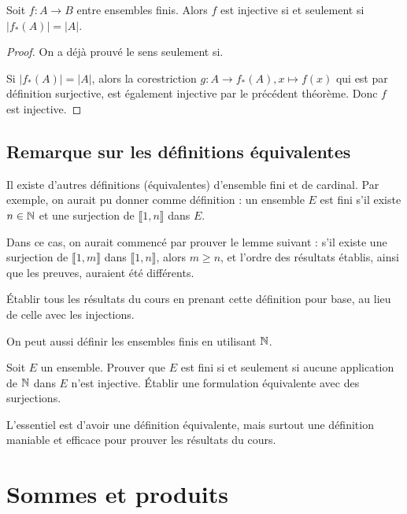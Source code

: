 \begin{corollaire}
Soit $f : A\to B$ entre ensembles finis. Alors $f$ est injective si et seulement si $|f_*(A)|=|A|$.
\end{corollaire}
\begin{proof}On a déjà prouvé le sens \og seulement si\fg.

Si $|f_*(A)|=|A|$, alors la corestriction $g : A\to f_*(A), x\mapsto f(x)$ qui est par définition surjective, est également injective par le précédent théorème. Donc $f$ est injective.
\end{proof}



\subsection{Remarque sur les définitions équivalentes}

Il existe d'autres définitions (équivalentes) d'ensemble fini et de cardinal.
Par exemple, on aurait pu donner comme définition  : un ensemble $E$ est fini s'il existe $n\in \mathbb{N}$ et une surjection de $\llbracket 1,n\rrbracket$ dans $E$.

Dans ce cas, on aurait commencé par prouver le lemme suivant : \og s'il existe une surjection de $\llbracket 1,m\rrbracket$ dans $\llbracket 1,n\rrbracket$, alors $m\geq n$\fg, et l'ordre des résultats établis, ainsi que les preuves, auraient été différents.

\begin{exercice} \'Etablir tous les résultats du cours en prenant  cette définition pour base, au lieu de celle avec les injections.
\end{exercice}

On peut aussi définir les ensembles finis en utilisant $\mathbb{N}$.

\begin{exercice}
Soit $E$ un ensemble.
Prouver que $E$ est fini si et seulement si aucune application de $\mathbb{N}$ dans $E$ n'est injective.
\'Etablir une formulation équivalente avec des surjections.
\end{exercice}

L'essentiel est d'avoir une définition équivalente, mais surtout une définition maniable et efficace pour prouver les résultats du cours.

\section{Sommes et produits}

